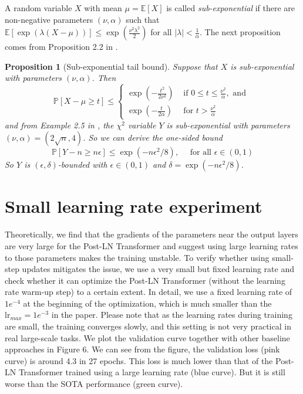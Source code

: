 \documentclass{article}
\newtheorem{proposition}{Proposition}
\begin{document}
A random variable $X$ with mean $\mu=\mathbb{E}[X]$ is called \emph{sub-exponential} if there are non-negative parameters $(\nu,\alpha)$ such that $\mathbb{E}[\exp(\lambda(X-\mu))]\leq \exp(\frac{\nu^2\lambda^2}{2})$ for all $|\lambda|<\frac{1}{\alpha}$. The next proposition comes from Proposition 2.2 in \citep{wainwright2019high}.
\begin{proposition}[Sub-exponential tail bound]
Suppose that $X$ is sub-exponential with parameters $(\nu,\alpha)$. Then 
\begin{equation}
\mathbb{P}[X-\mu \geq t] \leq\left\{\begin{array}{ll}{\exp(-\frac{t^{2}}{2 \nu^{2}})} & {\text { if } 0 \leq t \leq \frac{\nu^{2}}{\alpha}, \text { and }} \\ {\exp(-\frac{t}{2 \alpha})} & {\text { for } t>\frac{\nu^{2}}{\alpha}}\end{array}\right.
\end{equation}
and from Example 2.5 in \citep{wainwright2019high}, the $\chi^2$ variable $Y$ is sub-exponential with parameters $(\nu, \alpha)=(2 \sqrt{n}, 4)$. So we can derive the one-sided bound 
\begin{equation}
    \mathbb{P}\left[Y-n\geq n\epsilon\right] \leq \exp(-n \epsilon^{2} / 8), \quad \text { for all } \epsilon \in(0,1)
\end{equation}
So $Y$ is $(\epsilon,\delta)$-bounded with $\epsilon \in(0,1)$ and $\delta=\exp(-n\epsilon^2/8)$.


\end{proposition}



\section{Small learning rate experiment}

Theoretically, we find that the gradients of the parameters near the output layers are very large for the Post-LN Transformer and suggest using large learning rates to those parameters makes the training unstable. To verify whether using small-step updates mitigates the issue, 
we use a very small but fixed learning rate and check whether it can optimize the Post-LN Transformer (without the learning rate warm-up step) to a certain extent. In detail, we use a fixed learning rate of $1e^{-4}$ at the beginning of the optimization, which is much smaller than the $\text{lr}_{max}= 1e^{-3}$ in the paper. Please note that as the learning rates during training are small, the training converges slowly, and this setting is not very practical in real large-scale tasks. We plot the validation curve together with other baseline approaches in Figure 6. We can see from the figure, the validation loss (pink curve) is around 4.3 in 27 epochs. This loss is much lower than that of the Post-LN Transformer trained using a large learning rate (blue curve). But it is still worse than the SOTA performance (green curve). 
\end{document}
